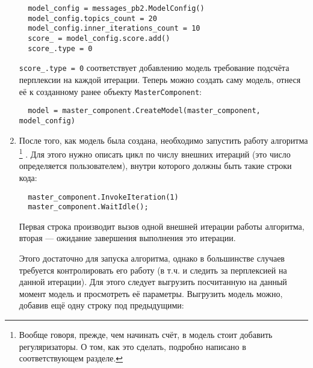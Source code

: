 \begin{enumerate}
	\vspace{5pt}
	
	\verb|  model_config = messages_pb2.ModelConfig()| \\
	\verb|  model_config.topics_count = 20| \\
	\verb|  model_config.inner_iterations_count = 10| \\	
	\verb|  score_ = model_config.score.add()| \\
	\verb|  score_.type = 0|
	        
	\vspace{5pt}
	
	\verb|score_.type = 0| соответствует добавлению модель требование подсчёта перплексии на каждой итерации. Теперь можно создать саму модель, отнеся её к созданному ранее объекту \verb|MasterComponent|:
	
	\vspace{5pt}
	
	\verb|	model = master_component.CreateModel(master_component, model_config)| \\
	
	\vspace{5pt}
	
	\item 
	\label{step_2}
	После того, как модель была создана, необходимо запустить работу алгоритма
	\footnote{Вообще говоря, прежде, чем начинать счёт, в модель стоит добавить регуляризаторы. О том, как это сделать, подробно написано в соответствующем разделе.}
	. Для этого нужно описать цикл по числу внешних итераций (это число определяется пользователем), внутри которого должны быть такие строки кода:
	
	\vspace{5pt}
	
	\verb|  master_component.InvokeIteration(1)| \\
	\verb|  master_component.WaitIdle();|
	        
	\vspace{5pt}	
	
	Первая строка производит вызов одной внешней итерации работы алгоритма, вторая --- ожидание завершения выполнения это итерации.
	
	Этого достаточно для запуска алгоритма, однако в большинстве случаев требуется контролировать его работу (в т.ч. и следить за перплексией на данной итерации). Для этого следует выгрузить посчитанную на данный момент модель и просмотреть её параметры. Выгрузить модель можно, добавив ещё одну строку под предыдущими:
	

\end{enumerate}
